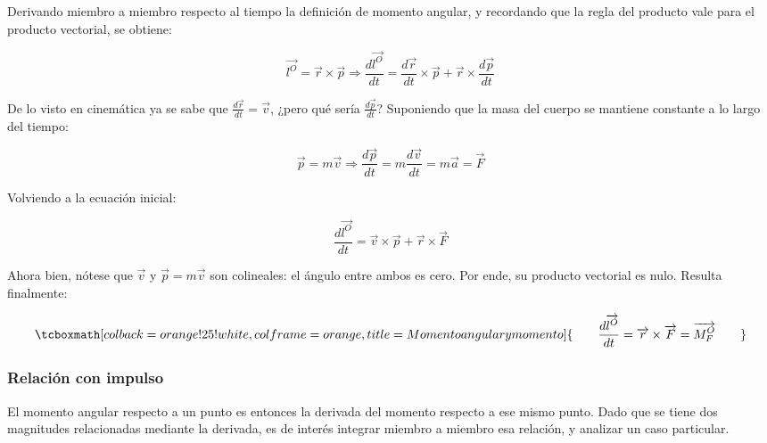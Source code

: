 \documentclass{article}
\begin{document}
Derivando miembro a miembro respecto al tiempo la definición de momento angular, y recordando que la regla del producto vale para el producto vectorial, se obtiene:

\begin{equation}
\overrightarrow{l^O} = \overrightarrow{r} \times \overrightarrow{p} \Rightarrow \frac{d\overrightarrow{l^O}}{dt} = \frac{d\overrightarrow{r}}{dt} \times \overrightarrow{p} + \overrightarrow{r} \times \frac{d\overrightarrow{p}}{dt}
\end{equation}

De lo visto en cinemática ya se sabe que $\frac{d\overrightarrow{r}}{dt} = \overrightarrow{v}$, ¿pero qué sería $\frac{d\overrightarrow{p}}{dt}$? Suponiendo que la masa del cuerpo se mantiene constante a lo largo del tiempo:

\begin{equation}
\overrightarrow{p} = m \overrightarrow{v} \Rightarrow \frac{d\overrightarrow{p}}{dt} = m \frac{d\overrightarrow{v}}{dt} = m \overrightarrow{a} = \overrightarrow{F}
\end{equation}

Volviendo a la ecuación inicial:

\begin{equation}
\frac{d\overrightarrow{l^O}}{dt} = \overrightarrow{v} \times \overrightarrow{p} + \overrightarrow{r} \times \overrightarrow{F}
\end{equation}

Ahora bien, nótese que $\overrightarrow{v}$ y $\overrightarrow{p} = m \overrightarrow{v}$ son colineales: el ángulo entre ambos es cero. Por ende, su producto vectorial es nulo. Resulta finalmente:

\begin{equation}
\tcboxmath[colback=orange!25!white,colframe=orange,title=Momento angular y momento]{
\quad \quad \frac{d\overrightarrow{l^O}}{dt} = \overrightarrow{r} \times \overrightarrow{F} = \overrightarrow{M^O_F} \quad \quad
}
\end{equation}

\subsubsection{Relación con impulso}

El momento angular respecto a un punto es entonces la derivada del momento respecto a ese mismo punto. Dado que se tiene dos magnitudes relacionadas mediante la derivada, es de interés integrar miembro a miembro esa relación, y analizar un caso particular.
\end{document}
